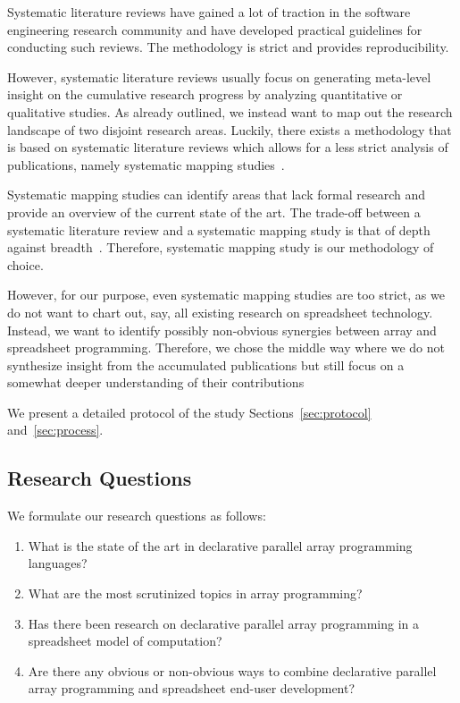 \documentclass[a4paper]{article}
\begin{document}
Systematic literature reviews have gained a lot of traction in the
software engineering research community and
\citet{keele2007guidelines} have developed practical guidelines for
conducting such reviews. The methodology is strict and provides
reproducibility.

However, systematic literature reviews usually focus on generating
meta-level insight on the cumulative research progress by analyzing
quantitative or qualitative studies. As already outlined, we instead
want to map out the research landscape of two disjoint research
areas. Luckily, there exists a methodology that is based on systematic
literature reviews which allows for a less strict analysis of
publications, namely systematic mapping
studies~\cite{petersen2008systematic}.

Systematic mapping studies can identify areas that lack formal
research and provide an overview of the current state of the art. The
trade-off between a systematic literature review and a systematic
mapping study is that of depth against
breadth~\cite{keele2007guidelines, petersen2008systematic}. Therefore,
systematic mapping study is our methodology of choice.

However, for our purpose, even systematic mapping studies are too
strict, as we do not want to chart out, say, all existing research on
spreadsheet technology. Instead, we want to identify possibly
non-obvious synergies between array and spreadsheet
programming. Therefore, we chose the middle way where we do not
synthesize insight from the accumulated publications but still focus
on a somewhat deeper understanding of their contributions

We present a detailed protocol of the study
Sections~\ref{sec:protocol} and~\ref{sec:process}.

\subsection{Research Questions}
\label{sec:research-questions}

We formulate our research questions as follows:

\begin{enumerate}
\item What is the state of the art in declarative parallel array
  programming languages?
\item What are the most scrutinized topics in array programming?
\item Has there been research on declarative parallel array
  programming in a spreadsheet model of computation?
\item Are there any obvious or non-obvious ways to combine declarative
  parallel array programming and spreadsheet end-user development?
\end{enumerate}
\end{document}

